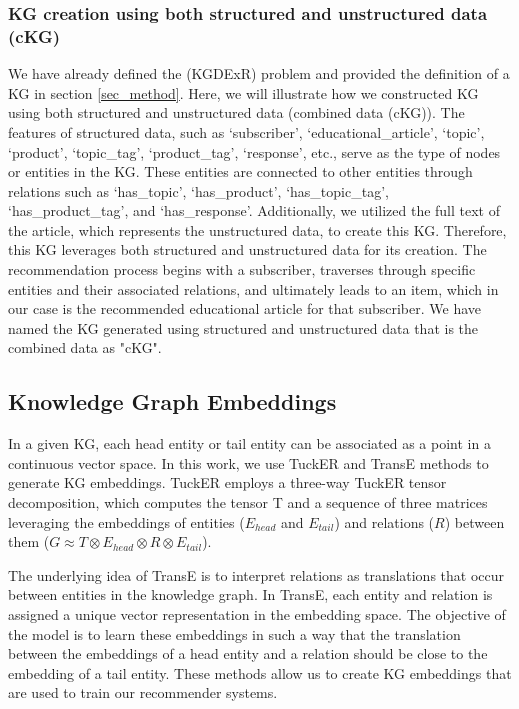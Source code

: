 \documentclass[11pt]{article}
\begin{document}
\subsubsection{KG creation using both structured and unstructured data (cKG)}
We have already defined the (KGDExR) problem and provided the definition of a KG in section \ref{sec_method}. Here, we will illustrate how we constructed KG using both structured and unstructured data (combined data (cKG)). The features of structured data, such as `subscriber', `educational\_article', `topic', `product', `topic\_tag', `product\_tag', `response', etc., serve as the type of nodes or entities in the KG. These entities are connected to other entities through relations such as `has\_topic', `has\_product', `has\_topic\_tag', `has\_product\_tag', and `has\_response'. Additionally, we utilized the full text of the article, which represents the unstructured data, to create this KG. Therefore, this KG leverages both structured and unstructured data for its creation. The recommendation process begins with a subscriber, traverses through specific entities and their associated relations, and ultimately leads to an item, which in our case is the recommended educational article for that subscriber. We have named the KG generated using structured and unstructured data that is the combined data as "cKG".



\subsection{Knowledge Graph Embeddings}

In a given KG, each head entity or tail entity can be associated as a point in a continuous vector space. In this work, we use TuckER \citep{balazevic2019tucker, info14050288} and TransE \cite{wang2014knowledge} methods to generate KG embeddings. TuckER employs a three-way TuckER tensor decomposition, which computes the tensor T and a sequence of three matrices leveraging the embeddings of entities ($E_{head}$ and $E_{tail}$) and relations ($R$) between them ($G \approx T \otimes E_{head} \otimes R \otimes E_{tail}$). 

The underlying idea of TransE is to interpret relations as translations that occur between entities in the knowledge graph. In TransE, each entity and relation is assigned a unique vector representation in the embedding space. The objective of the model is to learn these embeddings in such a way that the translation between the embeddings of a head entity and a relation should be close to the embedding of a tail entity. These methods allow us to create KG embeddings that are used to train our recommender systems.
\end{document}

